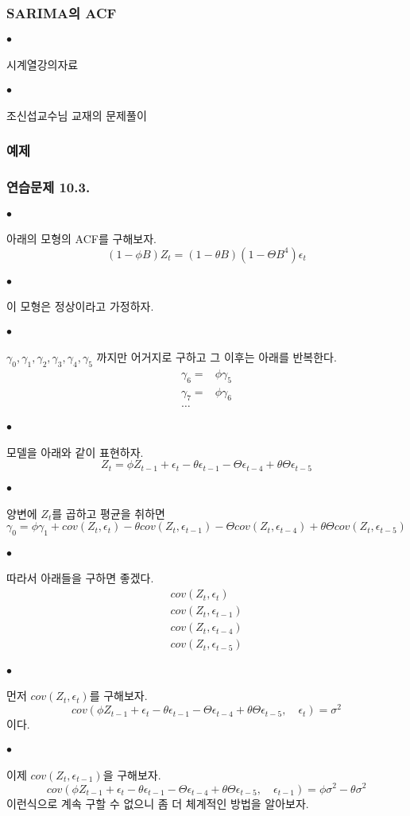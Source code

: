 \documentclass[12pt,oneside,english]{book}
\def\ck{\paragraph{\Large$\bullet$}\Large}
\begin{document}
\subsubsection{SARIMA의 ACF}
\ck 시계열강의자료 
\ck 조신섭교수님 교재의 문제풀이 

\subsubsection{예제}

\subsubsection{연습문제 10.3.}
\ck 아래의 모형의 ACF를 구해보자.
\[
(1-\phi B)Z_t=(1-\theta B)(1-\Theta B^4)\epsilon_t
\]

\ck 이 모형은 정상이라고 가정하자. 

\ck 
$\gamma_0,\gamma_1,\gamma_2,\gamma_3,\gamma_4,\gamma_5$ 까지만 어거지로 구하고 그 이후는 아래를 반복한다. 
\begin{align*}
\gamma_6=&\phi \gamma_5 \\ 
\gamma_7=&\phi \gamma_6 \\ 
\dots&
\end{align*}

\ck 모델을 아래와 같이 표현하자.
\[
Z_t=\phi Z_{t-1}+\epsilon_t-\theta \epsilon_{t-1} -\Theta \epsilon_{t-4} +\theta\Theta\epsilon_{t-5}
\]

\ck 양변에 $Z_{t}$를 곱하고 평균을 취하면 
\[
\gamma_0 = \phi \gamma_1 + cov(Z_t,\epsilon_{t})-\theta cov(Z_t,\epsilon_{t-1})-\Theta cov(Z_t,\epsilon_{t-4})+\theta\Theta cov(Z_t,\epsilon_{t-5})
\]

\ck 따라서 아래들을 구하면 좋겠다. 
\begin{align*}
cov(Z_t,\epsilon_{t})\\
cov(Z_t,\epsilon_{t-1})\\
cov(Z_t,\epsilon_{t-4})\\
cov(Z_t,\epsilon_{t-5}) 
\end{align*}

\ck 먼저 $cov(Z_{t},\epsilon_{t})$를 구해보자. 
\[
cov(\phi Z_{t-1}+\epsilon_t-\theta \epsilon_{t-1}-\Theta\epsilon_{t-4}+\theta\Theta\epsilon_{t-5},\quad \epsilon_t)=\sigma^2
\]
이다.

\ck 이제 $cov(Z_{t},\epsilon_{t-1})$을 구해보자. 
\[
cov(\phi Z_{t-1}+\epsilon_t-\theta \epsilon_{t-1}-\Theta\epsilon_{t-4}+\theta\Theta\epsilon_{t-5},\quad \epsilon_{t-1})=\phi\sigma^2-\theta\sigma^2
\]
이런식으로 계속 구할 수 없으니 좀 더 체계적인 방법을 알아보자. 
\end{document}
